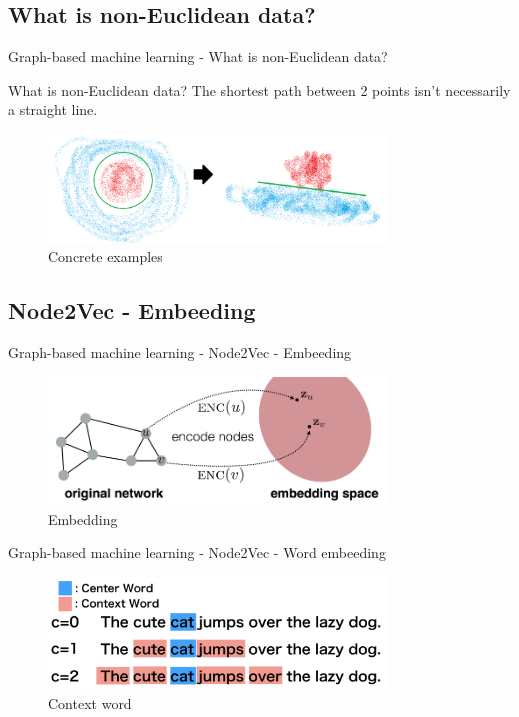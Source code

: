 \subsection{What is non-Euclidean data?}
\begin{frame}{Graph-based machine learning - What is non-Euclidean data?}
    \begin{block}{What is non-Euclidean data?}
        The shortest path between 2 points isn't necessarily a straight line.
    \end{block}

    \begin{figure}[htp]
        \centering
        \includegraphics[width=0.8\textwidth]{topics/201010-zhang2019comprehensive/assets/img/concrete_plot.png}
        \caption{Concrete examples}
    \end{figure}
\end{frame}

\subsection{Node2Vec - Embeeding}
\begin{frame}{Graph-based machine learning - Node2Vec - Embeeding}
    \begin{figure}[htp]
        \centering
        \includegraphics[width=0.8\textwidth]{topics/201010-zhang2019comprehensive/assets/img/euclid_space.png}
        \caption{Embedding}
    \end{figure}
\end{frame}

\begin{frame}{Graph-based machine learning - Node2Vec - Word embeeding}
    \begin{figure}[htp]
        \centering
        \includegraphics[width=0.8\textwidth]{topics/201010-zhang2019comprehensive/assets/img/context-word.png}
        \caption{Context word}
    \end{figure}
\end{frame}

